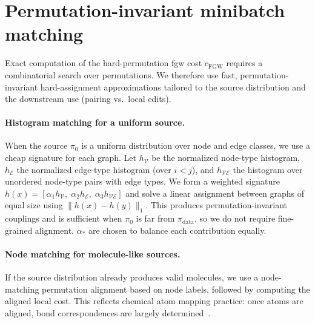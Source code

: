 \section{Permutation-invariant minibatch matching}
\label{app:matching}

Exact computation of the hard-permutation \gls{fgw} cost $c_{\mathrm{FGW}}$ requires a combinatorial search over
permutations. We therefore use fast, permutation-invariant hard-assignment approximations
tailored to the source distribution and the downstream use (pairing vs.\ local edits).

\paragraph{Histogram matching for a uniform source.}
When the source $\pi_0$ is a uniform distribution over node and edge classes, we use a cheap signature
for each graph. Let $h_\mathcal{V}$ be the normalized node-type histogram, $h_\mathcal{E}$ the normalized edge-type
histogram (over $i<j$), and $h_{\mathcal{V}\mathcal{E}}$ the histogram over unordered node-type pairs with edge types. We
form a weighted signature $h(x)=[\alpha_1 h_\mathcal{V},\;\alpha_2 h_\mathcal{E},\;\alpha_3 h_{\mathcal{V}\mathcal{E}}]$ and solve a linear assignment
between graphs of equal size using $\|h(x)-h(y)\|_1$. This produces permutation-invariant couplings and
is sufficient when $\pi_0$ is far from $\pi_{\mathrm{data}}$, so we do not require fine-grained alignment. $\alpha_{*}$ are chosen to balance each contribution equally.

\paragraph{Node matching for molecule-like sources.}
If the source distribution already produces valid molecules, we use a node-matching permutation alignment
based on node labels, followed by computing the
aligned local cost. This reflects chemical atom mapping practice: once atoms are aligned, bond
correspondences are largely determined~\citep{bell2019dockrmsd}.
